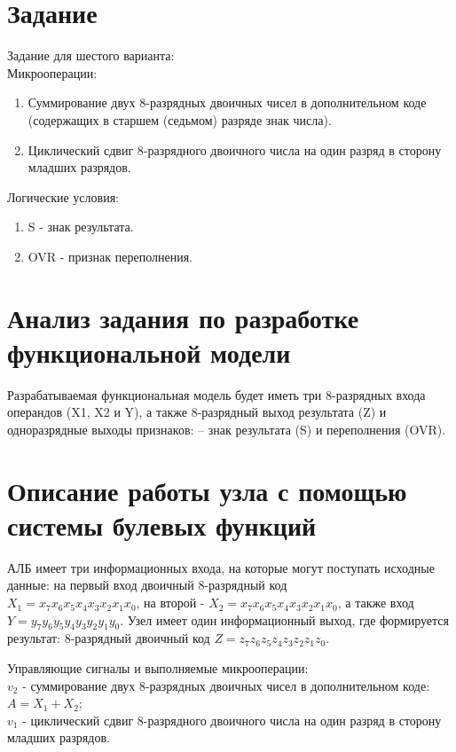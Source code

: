 \documentclass[oneside,a4paper,14pt]{extarticle}
\begin{document}
\newpage\thispagestyle{empty}
\newpage
\setcounter{page}{1}
\tableofcontents
\newpage

\section*{Задание}
Задание для шестого варианта:\\
Микрооперации:
\begin{enumerate}
	\item Суммирование двух 8-разрядных двоичных чисел в дополнительном коде (содержащих в старшем (седьмом) разряде знак числа).
	\item Циклический сдвиг 8-разрядного двоичного числа на один разряд в сторону младших разрядов.
\end{enumerate}
Логические условия:
\begin{enumerate}
	\item S - знак результата.
	\item OVR - признак переполнения.
\end{enumerate}
\section*{Анализ задания по разработке функциональной модели}

Разрабатываемая функциональная модель будет иметь три 8-разрядных входа операндов (X1, X2 и Y), а также 8-разрядный выход результата (Z) и одноразрядные выходы признаков: – знак результата (S) и переполнения (OVR).

\newpage\section*{Описание работы узла с помощью системы булевых функций}

АЛБ имеет три информационных входа, на которые могут поступать исходные данные: на первый вход двоичный 8-разрядный код\\
$X_1=x_7x_6x_5x_4x_3x_2x_1x_0$, на второй - $X_2=x_7x_6x_5x_4x_3x_2x_1x_0$, а также вход $Y=y_7y_6y_5y_4y_3y_2y_1y_0$. Узел имеет один информационный выход, где формируется результат: 8-разрядный двоичный код
$Z=z_7z_6z_5z_4z_3z_2z_1z_0$.

Управляющие сигналы и выполняемые микрооперации:\\
$ v_2 $ - суммирование двух 8-разрядных двоичных чисел в дополнительном коде: $A=X_1+X_2$;\\
$ v_1 $ - циклический сдвиг 8-разрядного двоичного числа на один разряд в сторону младших разрядов.\\
\end{document}
